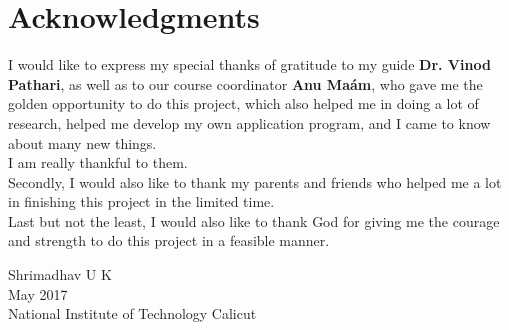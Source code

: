 \cleardoublepage
{}
{}
\chapter*{Acknowledgments}
\vspace{1.0in}

I would like to express my special thanks of gratitude to my guide \textbf{Dr. Vinod Pathari}, as well as to our course coordinator \textbf{Anu Ma\'am}, who gave me the golden opportunity to do this project, which also helped me in doing a lot of research, helped me develop my own application program, and I came to know about many new things. \\
I am really thankful to them. \\
Secondly, I would also like to thank my parents and friends who helped me a lot in finishing this project in the limited time. \\
Last but not the least, I would also like to thank God for giving me the courage and strength to do this project in a feasible manner. \\

\vfill

\begin{flushleft}
Shrimadhav U K \\
May 2017\\
{National Institute of Technology Calicut}\\
\end{flushleft}
\newpage
